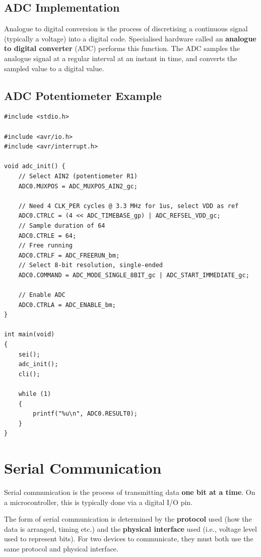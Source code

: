 \documentclass[a4paper]{report}
\begin{document}
\subsection{ADC Implementation}
Analogue to digital conversion is the process of discretising a continuous signal (typically a voltage)
into a digital code. Specialised hardware called an \textbf{analogue to digital converter} (ADC)
performs this function. The ADC samples the analogue signal at a regular interval at an instant in time, and
converts the sampled value to a digital value.
\subsection{ADC Potentiometer Example}
\begin{verbatim}
#include <stdio.h>

#include <avr/io.h>
#include <avr/interrupt.h>

void adc_init() {
    // Select AIN2 (potentiometer R1)
    ADC0.MUXPOS = ADC_MUXPOS_AIN2_gc;

    // Need 4 CLK_PER cycles @ 3.3 MHz for 1us, select VDD as ref
    ADC0.CTRLC = (4 << ADC_TIMEBASE_gp) | ADC_REFSEL_VDD_gc;
    // Sample duration of 64
    ADC0.CTRLE = 64;
    // Free running
    ADC0.CTRLF = ADC_FREERUN_bm;
    // Select 8-bit resolution, single-ended
    ADC0.COMMAND = ADC_MODE_SINGLE_8BIT_gc | ADC_START_IMMEDIATE_gc;

    // Enable ADC
    ADC0.CTRLA = ADC_ENABLE_bm;
}

int main(void)
{
    sei();
    adc_init();
    cli();

    while (1)
    {
        printf("%u\n", ADC0.RESULT0);
    }
}
\end{verbatim}
\section{Serial Communication}
Serial communication is the process of transmitting data \textbf{one bit at a time}.
On a microcontroller, this is typically done via a digital I/O pin.

The form of serial communication is determined by the \textbf{protocol} used (how the data is arranged, timing etc.)
and the \textbf{physical interface} used (i.e., voltage level used to represent bits).
For two devices to communicate, they must both use the same protocol and physical interface.
\end{document}
